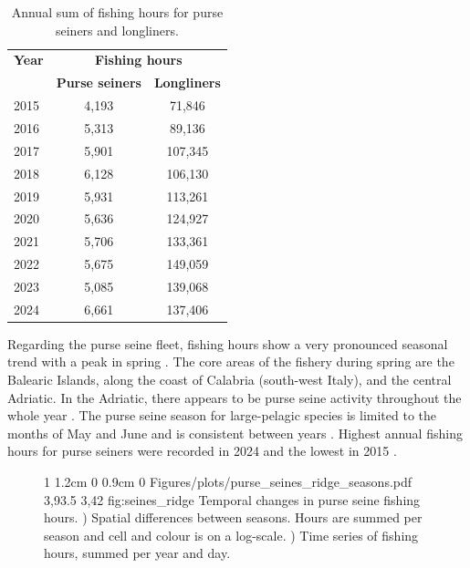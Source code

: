 \begin{table}[ht]
\centering
\caption{Annual sum of fishing hours for purse seiners and longliners.}
\medskip
\begin{tabular}{lcc}
\toprule
\textbf{Year} & \multicolumn{2}{c}{\textbf{Fishing hours}} \\
\cmidrule(lr){2-3}
                 & \textbf{Purse seiners} & \textbf{Longliners} \\
\midrule
2015   & 4,193   & 71,846 \\
2016   & 5,313   & 89,136 \\
2017   & 5,901   & 107,345 \\
2018   & 6,128   & 106,130 \\
2019   & 5,931   & 113,261 \\
2020   & 5,636   & 124,927 \\
2021   & 5,706   & 133,361 \\
2022   & 5,675   & 149,059 \\
2023   & 5,085   & 139,068 \\
2024   & 6,661   & 137,406 \\
\bottomrule
\end{tabular}
\label{tab:year_hours}
\end{table}

Regarding the purse seine fleet, fishing hours show a very pronounced seasonal trend with a peak in spring . The core areas of the fishery
during spring are the Balearic Islands, along the coast of Calabria (south-west Italy), and the central Adriatic. In the Adriatic, there appears to be
purse seine activity throughout the whole year . The purse seine season for large-pelagic species is limited to the months
of May and June and is consistent between years . Highest annual fishing hours for purse seiners were recorded in 2024 and the
lowest in 2015 .

\begin{figure}[ht]
    {1\linewidth}
    {1.2cm 0 0.9cm 0}                       %
    {Figures/plots/purse_seines_ridge_seasons.pdf} %
    {3,93.5}                                  %
    {3,42}                                  %
    {fig:seines_ridge}
    {%
    Temporal changes in purse seine fishing hours. ) Spatial differences between seasons. 
    Hours are summed per season and cell and colour is on a log-scale. ) Time series of fishing hours, summed per year 
    and day.}
\end{figure}

